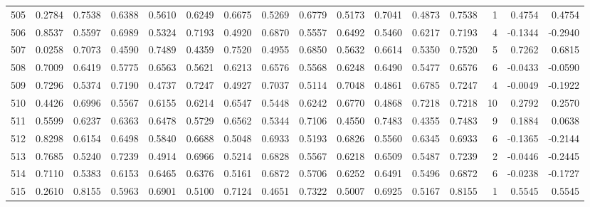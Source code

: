 \begin{tabular}{lrrrrrrrrrrrrrrr}
505 &      0.2784 &  0.7538 &  0.6388 &  0.5610 &  0.6249 &  0.6675 &  0.5269 &  0.6779 &  0.5173 &  0.7041 &   0.4873 &     0.7538 &      1 &                    0.4754 &                     0.4754 \\
506 &      0.8537 &  0.5597 &  0.6989 &  0.5324 &  0.7193 &  0.4920 &  0.6870 &  0.5557 &  0.6492 &  0.5460 &   0.6217 &     0.7193 &      4 &                   -0.1344 &                    -0.2940 \\
507 &      0.0258 &  0.7073 &  0.4590 &  0.7489 &  0.4359 &  0.7520 &  0.4955 &  0.6850 &  0.5632 &  0.6614 &   0.5350 &     0.7520 &      5 &                    0.7262 &                     0.6815 \\
508 &      0.7009 &  0.6419 &  0.5775 &  0.6563 &  0.5621 &  0.6213 &  0.6576 &  0.5568 &  0.6248 &  0.6490 &   0.5477 &     0.6576 &      6 &                   -0.0433 &                    -0.0590 \\
509 &      0.7296 &  0.5374 &  0.7190 &  0.4737 &  0.7247 &  0.4927 &  0.7037 &  0.5114 &  0.7048 &  0.4861 &   0.6785 &     0.7247 &      4 &                   -0.0049 &                    -0.1922 \\
510 &      0.4426 &  0.6996 &  0.5567 &  0.6155 &  0.6214 &  0.6547 &  0.5448 &  0.6242 &  0.6770 &  0.4868 &   0.7218 &     0.7218 &     10 &                    0.2792 &                     0.2570 \\
511 &      0.5599 &  0.6237 &  0.6363 &  0.6478 &  0.5729 &  0.6562 &  0.5344 &  0.7106 &  0.4550 &  0.7483 &   0.4355 &     0.7483 &      9 &                    0.1884 &                     0.0638 \\
512 &      0.8298 &  0.6154 &  0.6498 &  0.5840 &  0.6688 &  0.5048 &  0.6933 &  0.5193 &  0.6826 &  0.5560 &   0.6345 &     0.6933 &      6 &                   -0.1365 &                    -0.2144 \\
513 &      0.7685 &  0.5240 &  0.7239 &  0.4914 &  0.6966 &  0.5214 &  0.6828 &  0.5567 &  0.6218 &  0.6509 &   0.5487 &     0.7239 &      2 &                   -0.0446 &                    -0.2445 \\
514 &      0.7110 &  0.5383 &  0.6153 &  0.6465 &  0.6376 &  0.5161 &  0.6872 &  0.5706 &  0.6252 &  0.6491 &   0.5496 &     0.6872 &      6 &                   -0.0238 &                    -0.1727 \\
515 &      0.2610 &  0.8155 &  0.5963 &  0.6901 &  0.5100 &  0.7124 &  0.4651 &  0.7322 &  0.5007 &  0.6925 &   0.5167 &     0.8155 &      1 &                    0.5545 &                     0.5545 \\

\end{tabular}
